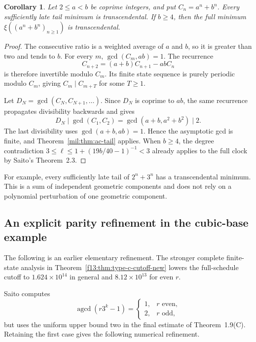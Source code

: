 \documentclass[11pt,a4paper]{article}
\newtheorem{corollary}[theorem]{Corollary}
\theoremstyle{definition}
\theoremstyle{remark}
\numberwithin{equation}{section}
\begin{document}
\begin{corollary}\label{mil:cor:ac-two-bases}
Let $2\le a<b$ be coprime integers, and put $C_n=a^n+b^n$.
Every sufficiently late tail minimum is transcendental. If
$b\ge4$, then the full minimum $\xi((a^n+b^n)_{n\ge1})$ is
transcendental.
\end{corollary}
\begin{proof}
The consecutive ratio is a weighted average of $a$ and $b$, so
it is greater than two and tends to $b$. For every $m$,
$\gcd(C_m,ab)=1$. The recurrence
\[
 C_{n+2}=(a+b)C_{n+1}-abC_n
\]
is therefore invertible modulo $C_m$. Its finite state sequence
is purely periodic modulo $C_m$, giving $C_m\mid C_{m+T}$ for
some $T\ge1$.

Let $D_N=\gcd(C_N,C_{N+1},\ldots)$. Since $D_N$ is coprime to
$ab$, the same recurrence propagates divisibility backwards and
gives
\[
 D_N\mid\gcd(C_1,C_2)
 =\gcd(a+b,a^2+b^2)\mid2.
\]
The last divisibility uses $\gcd(a+b,ab)=1$. Hence the asymptotic
gcd is finite, and Theorem~\ref{mil:thm:ac-tail} applies. When
$b\ge4$, the degree contradiction
$3\le\ell\le1+(19b/40-1)^{-1}<3$ already applies to the full
clock by Saito's Theorem~2.3.
\end{proof}

For example, every sufficiently late tail of $2^n+3^n$ has a
transcendental minimum. This is a sum of independent geometric
components and does not rely on a polynomial perturbation of one
geometric component.

\subsection{An explicit parity refinement in the cubic-base example}
The following is an earlier elementary refinement. The stronger complete
finite-state analysis in Theorem~\ref{f13:thm:type-c-cutoff-new} lowers
the full-schedule cutoff to $1.624\times10^{14}$ in general and
$8.12\times10^{13}$ for even $r$.


Saito computes
\[
 \operatorname{agcd}(r3^k-1)=
 \begin{cases}1,&r\text{ even},\\2,&r\text{ odd},\end{cases}
\]
but uses the uniform upper bound two in the final estimate of
Theorem~1.9(C). Retaining the first case gives the following
numerical refinement.
\end{document}
